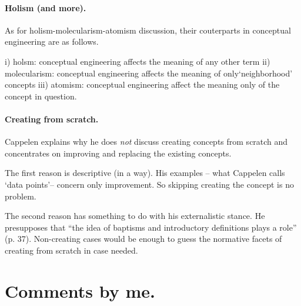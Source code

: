 \documentclass[
10pt, %
a4paper, %
twocolumn, %
landscape %
]{article}
\begin{document}
\paragraph{Holism (and more).}
As for holism-molecularism-atomism discussion, their couterparts in conceptual engineering are as follows.

i) holsm: conceptual engineering affects the meaning of any other term
ii) molecularism: conceptual engineering affects the meaning of  only`neighborhood' concepts
iii) atomism: conceptual engineering affect the meaning only of the concept in question.

\paragraph{Creating from scratch.}
Cappelen explains why he does \emph{not} discuss creating concepts from scratch and concentrates on improving and replacing the existing concepts.

The first reason is descriptive (in a way). His examples -- what Cappelen calls `data points'-- concern only improvement.
So skipping creating the concept is no problem.

The second reason has something to do with his externalistic stance. He presupposes that ``the idea of baptisms and introductory definitions plays a role'' (p. 37). Non-creating cases would be enough to guess the normative facets of creating from scratch in case needed.

\section*{Comments by me.}



\end{document}
